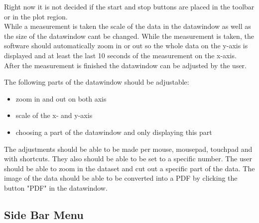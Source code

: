 \documentclass[]{scrreprt}
\begin{document}
Right now it is not decided if the start and stop buttons are placed in the toolbar or in the plot region. \\

While a measurement is taken the scale of the data in the datawindow as well as the size of the datawindow cant be changed. While the measurement is taken, the software should automatically zoom in or out so the whole data on the y-axis is displayed and at least the last 10 seconds of the measurement on the x-axis. \\

After the measurement is finished the datawindow can be adjusted by the user. 

The following parts of the datawindow should be adjustable: 

\begin{itemize}
    \item zoom in and out on both axis
    \item scale of the x- and y-axis 
    \item choosing a part of the datawindow and only displaying this part 
\end{itemize}

The adjustments should be able to be made per mouse, mousepad, touchpad and with shortcuts. They also should be able to be set to a specific number. 
The user should be able to zoom in the dataset and cut out a specific part of the data. The image of the data should be able to be converted into a PDF by clicking the button "PDF" in the datawindow. 


\subsection{Side Bar Menu}
\end{document}
